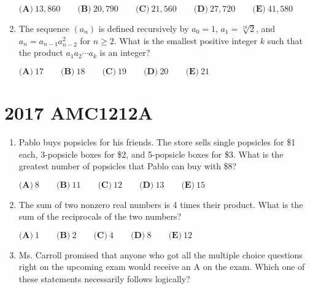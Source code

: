\documentclass{article}
\begin{document}
\begin{enumerate}[label=\arabic*., itemsep=0.5em]
\(\textbf{(A)}\ 13,860\qquad\textbf{(B)}\ 20,790\qquad\textbf{(C)}\ 21,560 \qquad\textbf{(D)}\ 27,720 \qquad\textbf{(E)}\ 41,580\)\par \vspace{0.5em}\item The sequence \((a_n)\) is defined recursively by \(a_0=1\), \(a_1=\sqrt[19]{2}\), and \(a_n=a_{n-1}a_{n-2}^2\) for \(n\geq 2\). What is the smallest positive integer \(k\) such that the product \(a_1a_2\cdots a_k\) is an integer?

\(\textbf{(A)}\ 17\qquad\textbf{(B)}\ 18\qquad\textbf{(C)}\ 19\qquad\textbf{(D)}\ 20\qquad\textbf{(E)}\ 21\)\par \vspace{0.5em}\end{enumerate}\newpage\section*{2017 AMC1212A}\begin{enumerate}[label=\arabic*., itemsep=0.5em]\item Pablo buys popsicles for his friends. The store sells single popsicles for \$1 each, 3-popsicle boxes for \$2, and 5-popsicle boxes for \$3. What is the greatest number of popsicles that Pablo can buy with \$8?

\(\textbf{(A)}\ 8\qquad\textbf{(B)}\ 11\qquad\textbf{(C)}\ 12\qquad\textbf{(D)}\ 13\qquad\textbf{(E)}\ 15\)\par \vspace{0.5em}\item The sum of two nonzero real numbers is 4 times their product. What is the sum of the reciprocals of the two numbers?

\(\textbf{(A)}\ 1\qquad\textbf{(B)}\ 2\qquad\textbf{(C)}\ 4\qquad\textbf{(D)}\ 8\qquad\textbf{(E)}\ 12\)\par \vspace{0.5em}\item Ms. Carroll promised that anyone who got all the multiple choice questions right on the upcoming exam would receive an A on the exam. Which one of these statements necessarily follows logically?


\end{enumerate}
\end{document}
